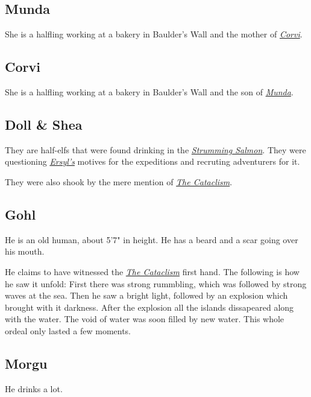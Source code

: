 \documentclass{article}
\begin{document}
\begin{multicols}{2}
    \subsection{Munda}
    \label{munda}

    She is a halfling working at a bakery in Baulder's Wall and the mother of \hyperref[corvi]{\textit{Corvi}}.

    \subsection{Corvi}
    \label{corvi}

    She is a halfling working at a bakery in Baulder's Wall and the son of \hyperref[munda]{\textit{Munda}}.

    \subsection{Doll \& Shea}
    \label{doll_shea}

    They are half-elfs that were found drinking in the \hyperref[strumming_salmon]{\textit{Strumming Salmon}}. They were questioning \hyperref[ersyl]{\textit{Ersyl's}} motives for the expeditions and recruting
    adventurers for it.

    They were also shook by the mere mention of \hyperref[cataclism]{\textit{The Cataclism}}.

    \subsection{Gohl}
    \label{gohl}

    He is an old human, about 5'7" in height. He has a beard and a scar going over his mouth.

    He claims to have witnessed the \hyperref[cataclism]{\textit{The Cataclism}} first hand. The following is how he saw it unfold:
    First there was strong rummbling, which was followed by strong waves at the sea. Then he saw a bright light, followed by an explosion which brought with it darkness. After the explosion all the islands
    dissapeared along with the water. The void of water was soon filled by new water.
    This whole ordeal only lasted a few moments.

    \subsection{Morgu}
    \label{morgu}

    He drinks a lot.


\end{multicols}
\end{document}
